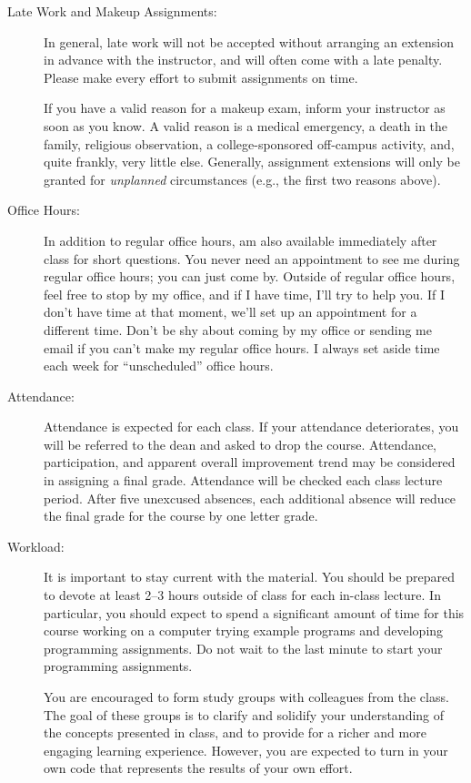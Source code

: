\documentclass [letterpaper,11pt]{article}
\begin{document}
\begin{description}
\item[Late Work and Makeup Assignments:]
In general, late work will not be accepted without arranging an extension in advance
with the instructor, and will often come with a late penalty.
Please make every effort to submit assignments on time.

If you have a valid reason for a makeup exam, inform your instructor
   as soon as you know.  A valid reason is a medical emergency, a death in the family, 
   religious observation, a college-sponsored off-campus activity, and, quite frankly, 
   very little else.  Generally, assignment extensions will only be granted for 
   \emph{unplanned} circumstances (e.g., the first two reasons above). 



\item[Office Hours:]
In addition to regular office hours, am also available immediately after class for 
short questions.  You never need an appointment to see me during regular office hours; you
can just come by.  Outside of regular office hours, feel free to stop by my office,
and if I have time, I'll try to help you.  If I don't have time at that moment, we'll set up an
appointment for a different time.
Don't be shy about coming by my office or sending me email
if you can't make my regular office hours.  I always set aside time each week for ``unscheduled'' office hours.


\item[Attendance:]
Attendance is expected for each class. If your attendance deteriorates, you will be referred to the dean and asked to drop the course. Attendance, participation, and apparent overall improvement trend may be considered in assigning a final grade.
Attendance will be checked each class lecture period.  After five unexcused absences, each additional absence will reduce the final grade for the course by one letter grade.

\item[Workload:]
It is important to stay current with the material.  You should be prepared to devote  at least 2--3 hours outside of class for each in-class lecture.  In particular, you should expect to spend a significant amount of time for this course working on a computer trying example programs and developing programming assignments. Do not wait to the last minute to start your programming assignments.

You are encouraged to form study groups with colleagues from the class. The goal of these groups is to clarify and solidify your understanding of the concepts presented in class, and to provide for a richer and more engaging learning experience. However, you are expected to turn in your own code that represents the results of your own effort.


\end{description}
\end{document}
